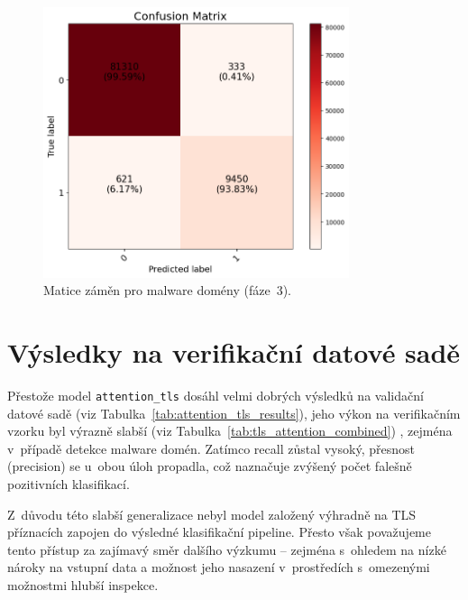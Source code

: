 \begin{figure}[H]
    \centering
    \includegraphics[width=0.8\textwidth]{obrazky-figures/attention_tls_stage_3_malware_v1.1_confusion_matrix.png}
    \caption{Matice záměn pro malware domény (fáze~3).}
    \label{fig:attention_tls_conf_matrix_malware}
\end{figure}

\section*{Výsledky na verifikační datové sadě}
\label{verification_fail}
Přestože model \texttt{attention\_tls} dosáhl velmi dobrých výsledků na validační datové sadě (viz Tabulka~\ref{tab:attention_tls_results}), jeho výkon na verifikačním vzorku byl výrazně slabší (viz Tabulka~\ref{tab:tls_attention_combined}) , zejména v~případě detekce malware domén. Zatímco recall zůstal vysoký, přesnost (precision) se u~obou úloh propadla, což naznačuje zvýšený počet falešně pozitivních klasifikací.

Z~důvodu této slabší generalizace nebyl model založený výhradně na TLS příznacích zapojen do výsledné klasifikační pipeline. Přesto však považujeme tento přístup za zajímavý směr dalšího výzkumu – zejména s~ohledem na nízké nároky na vstupní data a možnost jeho nasazení v~prostředích s~omezenými možnostmi hlubší inspekce.

